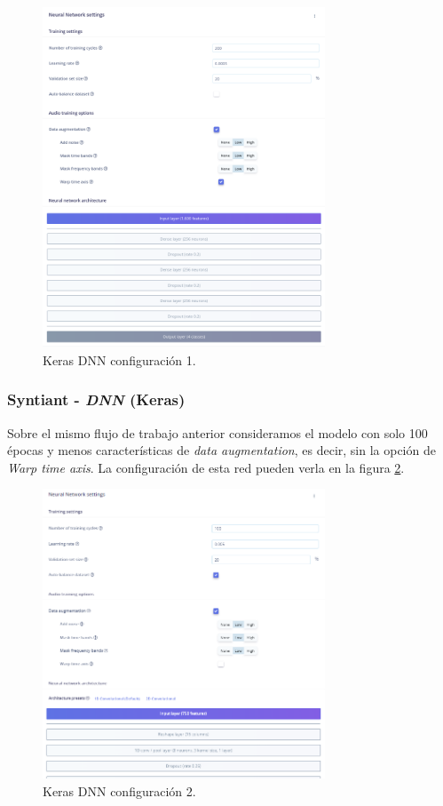 \documentclass[10pt]{article}
\begin{document}
\begin{figure}
    \centering
    \includegraphics[width=0.75\textwidth]{Syntiant to DNN Config.png}
    \caption{Keras DNN configuración 1.}
    \label{fig:config1}
\end{figure}

\subsubsection*{Syntiant - \textit{DNN} (Keras)}

Sobre el mismo flujo de trabajo anterior consideramos el modelo con solo 100 épocas y menos características de \textit{data augmentation}, es decir, sin la opción de \textit{Warp time axis}. La configuración de esta red pueden verla en la figura \ref{fig:config2}.

\begin{figure}
    \centering
    \includegraphics[width=0.75\textwidth]{Syntiant to DNN Config 2.png}
    \caption{Keras DNN configuración 2.}
    \label{fig:config2}
\end{figure}
\end{document}
